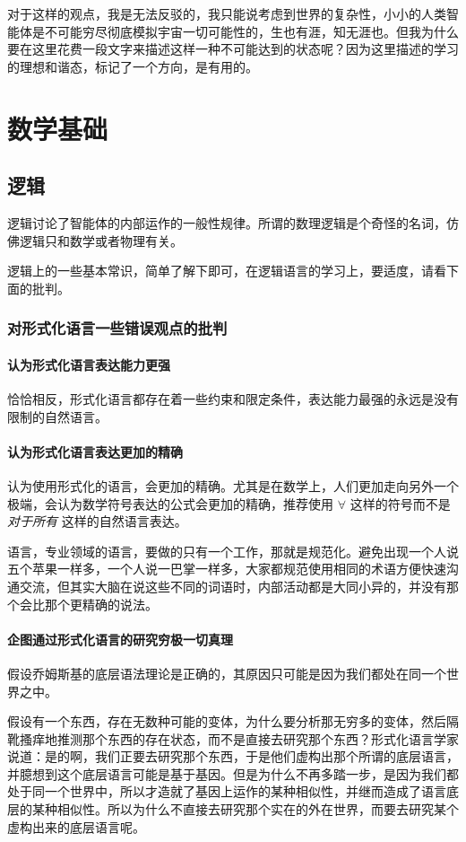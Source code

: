 \documentclass[12pt,oneside]{book}
\begin{document}
对于这样的观点，我是无法反驳的，我只能说考虑到世界的复杂性，小小的人类智能体是不可能穷尽彻底模拟宇宙一切可能性的，生也有涯，知无涯也。但我为什么要在这里花费一段文字来描述这样一种不可能达到的状态呢？因为这里描述的学习的理想和谐态，标记了一个方向，是有用的。

\chapter{数学基础}
\section{逻辑}
逻辑讨论了智能体的内部运作的一般性规律。所谓的数理逻辑是个奇怪的名词，仿佛逻辑只和数学或者物理有关。

逻辑上的一些基本常识，简单了解下即可，在逻辑语言的学习上，要适度，请看下面的批判。


\subsection{对形式化语言一些错误观点的批判}
\subsubsection{认为形式化语言表达能力更强}
恰恰相反，形式化语言都存在着一些约束和限定条件，表达能力最强的永远是没有限制的自然语言。


\subsubsection{认为形式化语言表达更加的精确}
认为使用形式化的语言，会更加的精确。尤其是在数学上，人们更加走向另外一个极端，会认为数学符号表达的公式会更加的精确，推荐使用 $\forall$ 这样的符号而不是 \textit{对于所有} 这样的自然语言表达。

语言，专业领域的语言，要做的只有一个工作，那就是规范化。避免出现一个人说五个苹果一样多，一个人说一巴掌一样多，大家都规范使用相同的术语方便快速沟通交流，但其实大脑在说这些不同的词语时，内部活动都是大同小异的，并没有那个会比那个更精确的说法。

\subsubsection{企图通过形式化语言的研究穷极一切真理}
假设乔姆斯基的底层语法理论是正确的，其原因只可能是因为我们都处在同一个世界之中。

假设有一个东西，存在无数种可能的变体，为什么要分析那无穷多的变体，然后隔靴搔痒地推测那个东西的存在状态，而不是直接去研究那个东西？形式化语言学家说道：是的啊，我们正要去研究那个东西，于是他们虚构出那个所谓的底层语言，并臆想到这个底层语言可能是基于基因。但是为什么不再多踏一步，是因为我们都处于同一个世界中，所以才造就了基因上运作的某种相似性，并继而造成了语言底层的某种相似性。所以为什么不直接去研究那个实在的外在世界，而要去研究某个虚构出来的底层语言呢。
\end{document}
